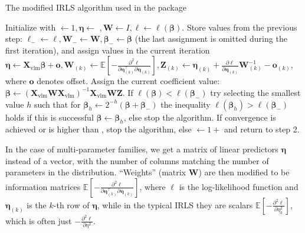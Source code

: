 \documentclass[
]{jss}
\newcommand{\1}{\mathcal{I}} \newcommand{\bZero}{\boldsymbol{0}}
\begin{document}
\begin{algorithm}[ht!]
\small
\caption{The modified IRLS algorithm used in the  package}
\label{algo-estimation}\DontPrintSemicolon
{} Initialize with $\leftarrow 1, \boldsymbol{\eta}\leftarrow$
    $, \boldsymbol{W}\leftarrow I, \ell\leftarrow\ell(\boldsymbol{\beta})$.\;
 Store values from the previous step: 
    $\ell_{-}\leftarrow\ell, \boldsymbol{W}_{-}\leftarrow\boldsymbol{W}, \boldsymbol{\beta}_{-}\leftarrow\boldsymbol{\beta}$ 
    (the last assignment is omitted during the first iteration), and assign values in the current iteration 
    $\displaystyle\boldsymbol{\eta}\leftarrow\boldsymbol{X}_{\text{vlm}}\boldsymbol{\beta}+\boldsymbol{o}, \boldsymbol{W}_{(k)}\leftarrow\mathbb{E}\left[-\frac{\partial^{2}\ell}{\partial\boldsymbol{\eta}_{(k)}^\top\partial\boldsymbol{\eta}_{(k)}}\right], \boldsymbol{Z}_{(k)}\leftarrow\boldsymbol{\eta}_{(k)}+\frac{\partial\ell}{\partial\boldsymbol{\eta}_{(k)}}\boldsymbol{W}_{(k)}^{-1}-\boldsymbol{o}_{(k)}$,\;
    where $\boldsymbol{o}$ denotes offset.\;
 Assign the current coefficient value: 
    $\boldsymbol{\beta}\leftarrow\left(\boldsymbol{X}_{\text{vlm}}\boldsymbol{W}\boldsymbol{X}_{\text{vlm}}\right)^{-1}\boldsymbol{X}_{\text{vlm}}\boldsymbol{W}\boldsymbol{Z}$.\;
 If $\ell(\boldsymbol{\beta})<\ell(\boldsymbol{\beta}_{-})$ try selecting the smallest value $h$ such that for
    $\boldsymbol{\beta}_{h}\leftarrow2^{-h}\left(\boldsymbol{\beta}+\boldsymbol{\beta}_{-}\right)$ the inequality $\ell(\boldsymbol{\beta}_{h})>\ell(\boldsymbol{\beta}_{-})$
    holds if this is successful $\boldsymbol{\beta}\leftarrow\boldsymbol{\beta}_{h}$, else stop the algorithm.\;
 If convergence is achieved or  is higher than , stop the algorithm, 
    else $\leftarrow 1+$ and return to step 2.
\end{algorithm}

In the case of multi-parameter families, we get a matrix of linear
predictors \(\boldsymbol{\eta}\) instead of a vector, with the number of
columns matching the number of parameters in the distribution.
``Weights'' (matrix \(\boldsymbol{W}\)) are then modified to be
information matrices
\(\displaystyle\mathbb{E}\left[-\frac{\partial^{2}\ell}{\partial\boldsymbol{\eta}_{(k)}^\top\partial\boldsymbol{\eta}_{(k)}}\right]\),
where \(\ell\) is the log-likelihood function and
\(\boldsymbol{\eta}_{(k)}\) is the \(k\)-th row of
\(\boldsymbol{\eta}\), while in the typical IRLS they are scalars
\(\displaystyle\mathbb{E}\left[-\frac{\partial^{2}\ell}{\partial\eta_{k}^{2}}\right]\),
which is often just
\(\displaystyle-\frac{\partial^{2}\ell}{\partial\eta^{2}}\).
\end{document}
